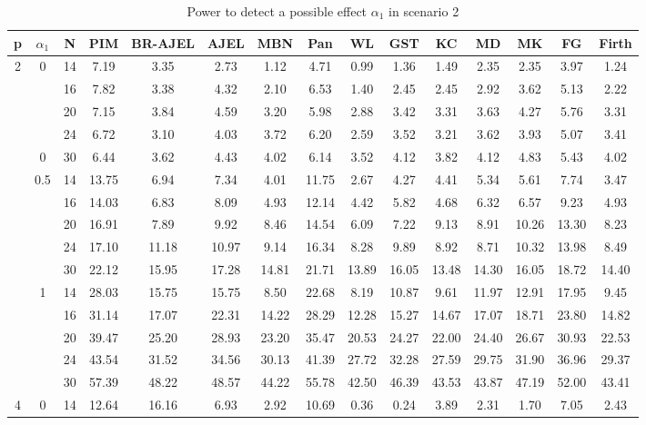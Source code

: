 \documentclass[num-refs]{wiley-article}
\begin{document}
\begin{table}[htbp!]
\caption{Power to detect a possible effect $\alpha_1$ in scenario 2}
\scriptsize
\centering
\begin{tabular}[t]{ccccccccccccccc}
\hline
p & $\alpha_1$ & N & PIM & BR-AJEL & AJEL & MBN & Pan & WL & GST & KC & MD & MK & FG & Firth\\
\hline
2 & 0 & 14 & 7.19 & 3.35 & 2.73 & 1.12 & 4.71 & 0.99 & 1.36 & 1.49 & 2.35 & 2.35 & 3.97 & 1.24\\
& & 16 & 7.82 & 3.38 & 4.32 & 2.10 & 6.53 & 1.40 & 2.45 & 2.45 & 2.92 & 3.62 & 5.13 & 2.22\\
& & 20 & 7.15 & 3.84 & 4.59 & 3.20 & 5.98 & 2.88 & 3.42 & 3.31 & 3.63 & 4.27 & 5.76 & 3.31\\
& & 24 & 6.72 & 3.10 & 4.03 & 3.72 & 6.20 & 2.59 & 3.52 & 3.21 & 3.62 & 3.93 & 5.07 & 3.41\\
&0 & 30 & 6.44 & 3.62 & 4.43 & 4.02 & 6.14 & 3.52 & 4.12 & 3.82 & 4.12 & 4.83 & 5.43 & 4.02\\
\hline
 & 0.5 & 14 & 13.75 & 6.94 & 7.34 & 4.01 & 11.75 & 2.67 & 4.27 & 4.41 & 5.34 & 5.61 & 7.74 & 3.47\\
& & 16 & 14.03 & 6.83 & 8.09 & 4.93 & 12.14 & 4.42 & 5.82 & 4.68 & 6.32 & 6.57 & 9.23 & 4.93\\
& & 20 & 16.91 & 7.89 & 9.92 & 8.46 & 14.54 & 6.09 & 7.22 & 9.13 & 8.91 & 10.26 & 13.30 & 8.23\\
& & 24 & 17.10 & 11.18 & 10.97 & 9.14 & 16.34 & 8.28 & 9.89 & 8.92 & 8.71 & 10.32 & 13.98 & 8.49\\
& & 30 & 22.12 & 15.95 & 17.28 & 14.81 & 21.71 & 13.89 & 16.05 & 13.48 & 14.30 & 16.05 & 18.72 & 14.40\\
\hline
 & 1 & 14 & 28.03 & 15.75 & 15.75 & 8.50 & 22.68 & 8.19 & 10.87 & 9.61 & 11.97 & 12.91 & 17.95 & 9.45\\
& & 16 & 31.14 & 17.07 & 22.31 & 14.22 & 28.29 & 12.28 & 15.27 & 14.67 & 17.07 & 18.71 & 23.80 & 14.82\\
& & 20 & 39.47 & 25.20 & 28.93 & 23.20 & 35.47 & 20.53 & 24.27 & 22.00 & 24.40 & 26.67 & 30.93 & 22.53\\
& & 24 & 43.54 & 31.52 & 34.56 & 30.13 & 41.39 & 27.72 & 32.28 & 27.59 & 29.75 & 31.90 & 36.96 & 29.37\\
& & 30 & 57.39 & 48.22 & 48.57 & 44.22 & 55.78 & 42.50 & 46.39 & 43.53 & 43.87 & 47.19 & 52.00 & 43.41\\
\hline
4 & 0& 14 & 12.64 & 16.16 & 6.93 & 2.92 & 10.69 & 0.36 & 0.24 & 3.89 & 2.31 & 1.70 & 7.05 & 2.43\\

\end{tabular}
\end{table}
\end{document}
